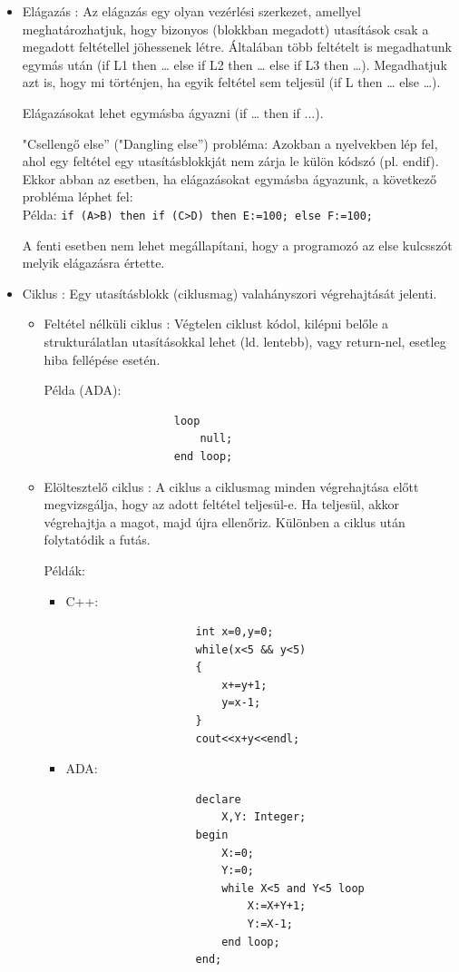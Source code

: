 \documentclass[margin=0px]{article}
\begin{document}
	\begin{itemize}
		\item	Elágazás : Az elágazás egy olyan vezérlési szerkezet, amellyel meghatározhatjuk, hogy bizonyos
		(blokkban megadott) utasítások csak a megadott feltétellel jöhessenek létre.
		Általában több feltételt is megadhatunk egymás után (if L1 then … else if L2 then … else if L3 then …).
		Megadhatjuk azt is, hogy mi történjen, ha egyik feltétel sem teljesül (if L then … else …).
	
		Elágazásokat lehet egymásba ágyazni (if … then if ...).
		
		"Csellengő else” ("Dangling else”) probléma: Azokban a nyelvekben lép fel, ahol egy feltétel egy
		utasításblokkját nem zárja le külön kódszó (pl. endif). Ekkor abban az esetben, ha elágazásokat
		egymásba ágyazunk, a következő probléma léphet fel:\\
		Példa: \texttt{if (A>B) then if (C>D) then E:=100; else F:=100;}
		
		A fenti esetben nem lehet megállapítani, hogy a programozó az else kulcsszót melyik elágazásra
		értette.
		
		\item	Ciklus : Egy utasításblokk (ciklusmag) valahányszori végrehajtását jelenti.
		\begin{itemize}
			\item	Feltétel nélküli ciklus : Végtelen ciklust kódol, kilépni belőle a strukturálatlan utasításokkal lehet
			(ld. lentebb), vagy return-nel, esetleg hiba fellépése esetén.
			
			Példa (ADA):
				\begin{verbatim}
					loop
					    null;
					end loop;
				\end{verbatim}
		
			\item	Elöltesztelő ciklus : A ciklus a ciklusmag minden végrehajtása előtt megvizsgálja, hogy az adott
			feltétel teljesül-e. Ha teljesül, akkor végrehajtja a magot, majd újra ellenőriz. Különben a ciklus
			után folytatódik a futás.
			
			Példák:
			\begin{itemize}
				\item	C++:
				\begin{verbatim}
					int x=0,y=0;
					while(x<5 && y<5)
					{
					    x+=y+1;
					    y=x-1;
					}
					cout<<x+y<<endl;
				\end{verbatim}
				
				\item	ADA:
				\begin{verbatim}
					declare
					    X,Y: Integer;
					begin
					    X:=0;
					    Y:=0;
					    while X<5 and Y<5 loop
					        X:=X+Y+1;
					        Y:=X-1;
					    end loop;
					end;
				\end{verbatim}
			\end{itemize}
			

\end{itemize}
\end{itemize}
\end{document}

